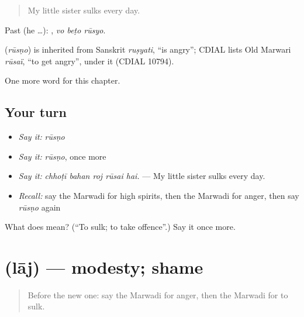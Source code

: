 \begin{quote}
My little sister sulks every day.
\end{quote}

Past (he …):   , \emph{vo beṭo rūsyo}.

\begin{cousinweb}
\textbf{} (\emph{rūsṇo}) is inherited from Sanskrit \emph{ruṣyati}, \textquotedblleft{}is angry\textquotedblright{}; CDIAL lists Old Marwari \emph{rūsaï}, \textquotedblleft{}to get angry\textquotedblright{}, under it (CDIAL 10794).
\end{cousinweb}

\begin{grammarlens}[title={What you've built}]
One more word for this chapter.
\end{grammarlens}

\subsection*{Your turn}
\begin{itemize}
\raggedright
  \item \emph{Say it:} \emph{rūsṇo}
  \item \emph{Say it:} \emph{rūsṇo}, once more
  \item \emph{Say it:} \emph{chhoṭī bahan roj rūsai hai.} — My little sister sulks every day.
  \item \emph{Recall:} say the Marwadi for high spirits, then the Marwadi for anger, then say \emph{rūsṇo} again
\end{itemize}

\begin{tcolorbox}[breakable,colback=teal!4,colframe=teal!35!black,title={Before you move on}]
What does  mean? (\textquotedblleft{}To sulk; to take offence\textquotedblright{}.) Say it once more.
\end{tcolorbox}
\section[\texorpdfstring{\mw{लाज} (lāj)}{लाज (lāj)}]{ (lāj) — modesty; shame}

\label{lesson:MW-C257-laj}



\begin{quote}
Before the new one: say the Marwadi for anger, then the Marwadi for to sulk.
\end{quote}

